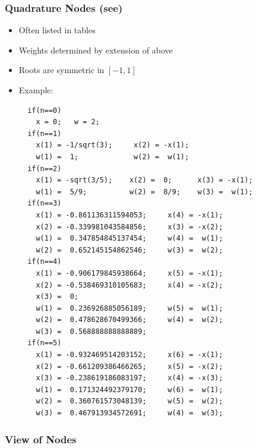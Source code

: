 \documentclass[10pt]{beamer}
\begin{document}
\begin{frame}
\frametitle{Quadrature Nodes (see) }
\begin{itemize}
  \item Often listed in tables
  \item Weights determined by extension of above
  \item Roots are symmetric in $[-1,1]$
  \item Example:
  \begin{lstlisting}
  if(n==0)
    x = 0;   w = 2;
  if(n==1)
    x(1) = -1/sqrt(3);     x(2) = -x(1);
    w(1) =  1;             w(2) =  w(1);
  if(n==2)
    x(1) = -sqrt(3/5);    x(2) =  0;      x(3) = -x(1);
    w(1) =  5/9;          w(2) =  8/9;    w(3) =  w(1);
  if(n==3)
    x(1) = -0.861136311594053;     x(4) = -x(1);
    x(2) = -0.339981043584856;     x(3) = -x(2);
    w(1) =  0.347854845137454;     w(4) =  w(1);
    w(2) =  0.652145154862546;     w(3) =  w(2);
  if(n==4)
    x(1) = -0.906179845938664;     x(5) = -x(1);
    x(2) = -0.538469310105683;     x(4) = -x(2);
    x(3) =  0;
    w(1) =  0.236926885056189;     w(5) =  w(1);
    w(2) =  0.478628670499366;     w(4) =  w(2);
    w(3) =  0.568888888888889;
  if(n==5)
    x(1) = -0.932469514203152;     x(6) = -x(1);
    x(2) = -0.661209386466265;     x(5) = -x(2);
    x(3) = -0.238619186083197;     x(4) = -x(3);
    w(1) =  0.171324492379170;     w(6) =  w(1);
    w(2) =  0.360761573048139;     w(5) =  w(2);
    w(3) =  0.467913934572691;     w(4) =  w(3);
  \end{lstlisting}
\end{itemize}
\end{frame}
\begin{frame}
\frametitle{View of Nodes}
\begin{center}
\end{center}
\end{frame}
\end{document}
